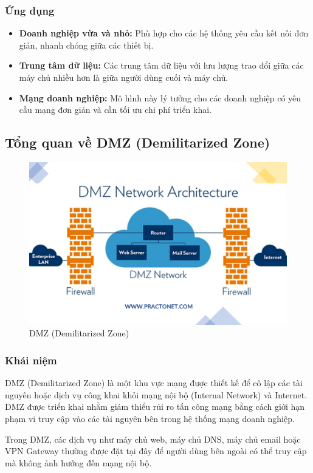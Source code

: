 \documentclass[13pt]{article}
\begin{document}
\newpage
\subsubsection{Ứng dụng}
\begin{itemize}
    \item \textbf{Doanh nghiệp vừa và nhỏ: }Phù hợp cho các hệ thống yêu cầu kết nối đơn giản, nhanh chóng giữa các thiết bị.
    \item \textbf{Trung tâm dữ liệu: }Các trung tâm dữ liệu với lưu lượng trao đổi giữa các máy chủ nhiều hơn là giữa người dùng cuối và máy chủ.
    \item \textbf{Mạng doanh nghiệp: }Mô hình này lý tưởng cho các doanh nghiệp có yêu cầu mạng đơn giản và cần tối ưu chi phí triển khai.
\end{itemize}

\subsection{Tổng quan về DMZ (Demilitarized Zone)}
    \begin{figure}[h!]
        \centering
        \includegraphics[width=0.7\linewidth]{image/18.png}
            \caption{DMZ (Demilitarized Zone)}
            \label{fig:label1}
    \end{figure}
    
\subsubsection{Khái niệm}
    DMZ (Demilitarized Zone) là một khu vực mạng được thiết kế để cô lập các tài nguyên hoặc dịch vụ công khai khỏi mạng nội bộ (Internal Network) và Internet. DMZ được triển khai nhằm giảm thiểu rủi ro tấn công mạng bằng cách giới hạn phạm vi truy cập vào các tài nguyên bên trong hệ thống mạng doanh nghiệp.

    Trong DMZ, các dịch vụ như máy chủ web, máy chủ DNS, máy chủ email hoặc VPN Gateway thường được đặt tại đây để người dùng bên ngoài có thể truy cập mà không ảnh hưởng đến mạng nội bộ.
\end{document}
